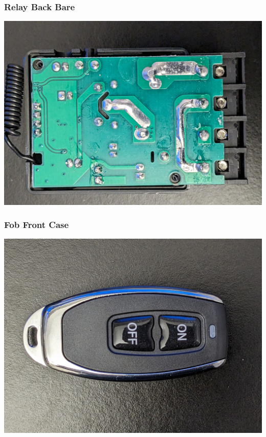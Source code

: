 \documentclass{beamer}
\begin{document}
\begin{frame}
\frametitle{Relay Back Bare}
  \includegraphics[width=\textwidth]{../Pics/device/relay_back_bare.jpg}
\end{frame}

\begin{frame}
\frametitle{Fob Front Case}
  \includegraphics[width=\textwidth]{../Pics/device/fob_front_case.jpg}
\end{frame}
\end{document}
